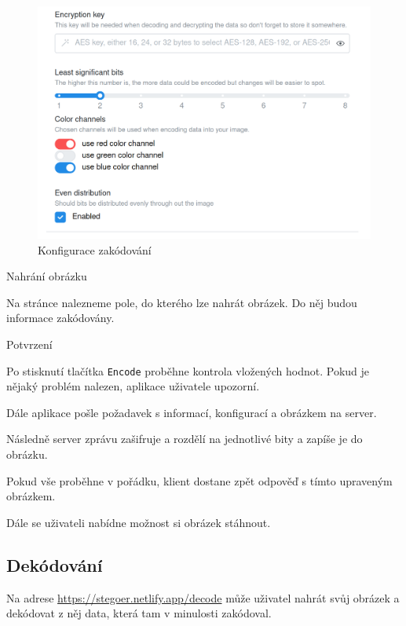 \begin{figure}
    \centering
    \includegraphics[scale=0.5]{assets/images/encode-configuration}
    \caption{Konfigurace zakódování}\label{fig:konfigurace-zakodovani}
\end{figure}

\begin{subsubsection}{Nahrání obrázku}\label{subsubsec:enc-nahrani-obrazku}

Na stránce nalezneme pole, do kterého lze nahrát obrázek.
Do něj budou informace zakódovány.

\end{subsubsection}

\begin{subsubsection}{Potvrzení}\label{subsubsec:enc-potvrzeni}

Po stisknutí tlačítka \texttt{Encode} proběhne kontrola vložených hodnot.
Pokud je nějaký problém nalezen, aplikace uživatele upozorní.

Dále aplikace pošle požadavek s informací, konfigurací a
obrázkem na server.

Následně server zprávu zašifruje a rozdělí na jednotlivé bity a zapíše je do
obrázku.

Pokud vše proběhne v pořádku, klient dostane zpět odpověď s tímto upraveným
obrázkem.

Dále se uživateli nabídne možnost si obrázek stáhnout.

\end{subsubsection}

\subsection{Dekódování}\label{subsec:dekodovani-dat}
Na adrese \url{https://stegoer.netlify.app/decode} může uživatel nahrát svůj
obrázek a dekódovat z něj data, která tam v minulosti zakódoval.

